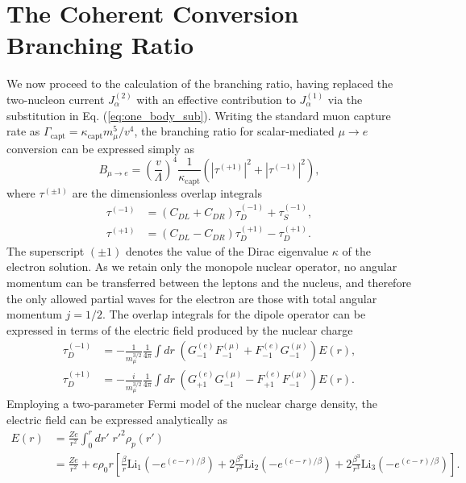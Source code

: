 \documentclass[12pt,letterpaper]{book}
\begin{document}
\section{The Coherent Conversion Branching Ratio}
We now proceed to the calculation of the branching ratio, having replaced the two-nucleon current $J_\alpha^{(2)}$ with an effective contribution to $J_\alpha^{(1)}$ via the substitution in Eq. (\ref{eq:one_body_sub}).  Writing the standard muon capture rate as $\Gamma_\mathrm{capt}=\kappa_\mathrm{capt}m_{\mu}^5/v^4$, the branching ratio for scalar-mediated $\mu\rightarrow e$ conversion can be expressed simply as 
\begin{equation}
B_{\mu\rightarrow e}=\left(\frac{v}{\Lambda}\right)^4\frac{1}{\kappa_\mathrm{capt}}\left(\left|\tau^{(+1)}\right|^2+\left|\tau^{(-1)}\right|^2\right),
\label{eq:coherent_mu2e_BR}
\end{equation}
where $\tau^{(\pm 1)}$ are the dimensionless overlap integrals
\begin{equation}
\begin{split}
\tau^{(-1)}&=\left(C_{DL}+C_{DR}\right)\tau^{(-1)}_D+\tau_S^{(-1)},\\
\tau^{(+1)}&=\left(C_{DL}-C_{DR}\right)\tau_D^{(+1)}-\tau_D^{(+1)}.
\end{split}
\end{equation}
The superscript $(\pm 1)$ denotes the value of the Dirac eigenvalue $\kappa$ of the electron solution. As we retain only the monopole nuclear operator, no angular momentum can be transferred between the leptons and the nucleus, and therefore the only allowed partial waves for the electron are those with total angular momentum $j=1/2$. The overlap integrals for the dipole operator can be expressed in terms of the electric field produced by the nuclear charge
\begin{equation}
\begin{split}
\tau_D^{(-1)}&=-\frac{1}{m_{\mu}^{3/2}}\frac{1}{4\pi}\int dr\;\left(G_{-1}^{(e)}F_{-1}^{(\mu)}+F_{-1}^{(e)}G_{-1}^{(\mu)}\right)E(r),\\
\tau_D^{(+1)}&=-\frac{i}{m_{\mu}^{3/2}}\frac{1}{4\pi}\int dr\;\left(G_{+1}^{(e)}G_{-1}^{(\mu)}-F_{+1}^{(e)}F_{-1}^{(\mu)}\right)E(r).
\end{split}
\end{equation}
Employing a two-parameter Fermi model of the nuclear charge density, the electric field can be expressed analytically as
\begin{equation}
\begin{split}
E(r)&=\frac{Ze}{r^2}\int_0^rdr'\;r'^2\rho_p(r')\\
&=\frac{Ze}{r^2}+e\rho_0r\left[\frac{\beta}{r}\mathrm{Li}_1\left(-e^{(c-r)/\beta}\right)+2\frac{\beta^2}{r^2}\mathrm{Li}_2\left(-e^{(c-r)/\beta}\right)+2\frac{\beta^3}{r^3}\mathrm{Li}_3\left(-e^{(c-r)/\beta}\right)\right].
\end{split}
\end{equation}
\end{document}

